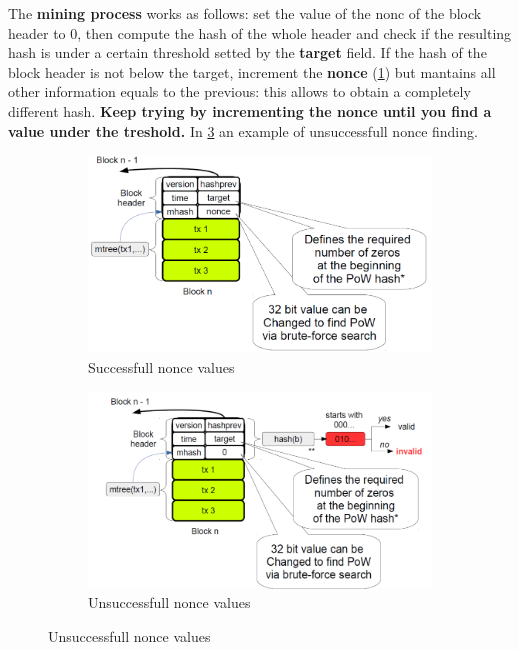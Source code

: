 \documentclass[10pt,a4paper]{report}
\begin{document}
The \textbf{mining process} works as follows: set the value of the nonc of the block header to 0, then compute the hash of the whole header and check if the resulting hash is under a certain threshold setted by the \textbf{target} field.
If the hash of the block header is not below the target, increment the \textbf{nonce} (\ref{good-nonce}) but mantains all other information equals to the previous: this allows to obtain a completely different hash. \textbf{Keep trying by incrementing the nonce until you find a value under the treshold.} In \ref{failed-nonce} an example of unsuccessfull nonce finding.

\begin{figure}[h]
	\centering
	\begin{subfigure}{.5\textwidth}
		\centering
		\includegraphics[width=.9\linewidth]{images/Pasted image 20230331151651.png}
		\caption{Successfull nonce values}
		\label{good-nonce}
	\end{subfigure}%
	\begin{subfigure}{.5\textwidth}
		\centering
		\includegraphics[width=.9\linewidth]{images/Pasted image 20230331151803.png}
		\caption{Unsuccessfull nonce values}
		\label{failed-nonce}
	\end{subfigure}

\end{figure}
\end{document}
